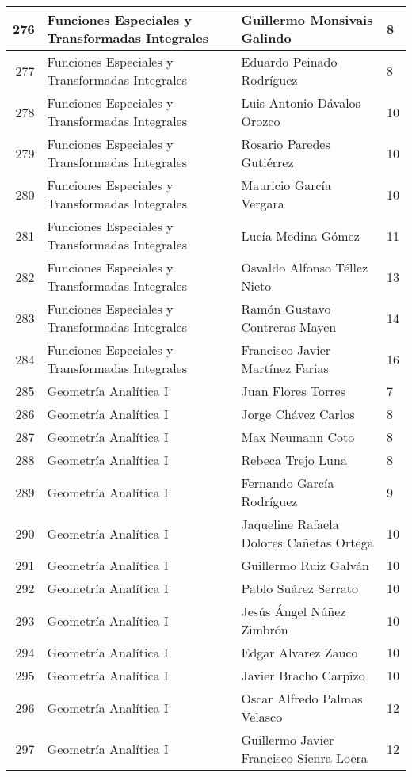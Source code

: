 \begin{table}[ht]
\begin{tabular}{rlll}
  276 & Funciones Especiales y Transformadas Integrales & Guillermo Monsivais Galindo & 8 \\ \hline
  277 & Funciones Especiales y Transformadas Integrales & Eduardo Peinado Rodríguez & 8 \\ \hline
  278 & Funciones Especiales y Transformadas Integrales & Luis Antonio Dávalos Orozco & 10 \\ \hline
  279 & Funciones Especiales y Transformadas Integrales & Rosario Paredes Gutiérrez & 10 \\ \hline
  280 & Funciones Especiales y Transformadas Integrales & Mauricio García Vergara & 10 \\ \hline
  281 & Funciones Especiales y Transformadas Integrales & Lucía Medina Gómez & 11 \\ \hline
  282 & Funciones Especiales y Transformadas Integrales & Osvaldo Alfonso Téllez Nieto & 13 \\ \hline
  283 & Funciones Especiales y Transformadas Integrales & Ramón Gustavo Contreras Mayen & 14 \\ \hline
  284 & Funciones Especiales y Transformadas Integrales & Francisco Javier Martínez Farias & 16 \\ \hline
  285 & Geometría Analítica I & Juan Flores Torres & 7 \\ \hline
  286 & Geometría Analítica I & Jorge Chávez Carlos & 8 \\ \hline
  287 & Geometría Analítica I & Max Neumann Coto & 8 \\ \hline
  288 & Geometría Analítica I & Rebeca Trejo Luna & 8 \\ \hline
  289 & Geometría Analítica I & Fernando García Rodríguez & 9 \\ \hline
  290 & Geometría Analítica I & Jaqueline Rafaela Dolores Cañetas Ortega & 10 \\ \hline
  291 & Geometría Analítica I & Guillermo Ruiz Galván & 10 \\ \hline
  292 & Geometría Analítica I & Pablo Suárez Serrato & 10 \\ \hline
  293 & Geometría Analítica I & Jesús Ángel Núñez Zimbrón & 10 \\ \hline
  294 & Geometría Analítica I & Edgar Alvarez Zauco & 10 \\ \hline
  295 & Geometría Analítica I & Javier Bracho Carpizo & 10 \\ \hline
  296 & Geometría Analítica I & Oscar Alfredo Palmas Velasco & 12 \\ \hline
  297 & Geometría Analítica I & Guillermo Javier Francisco Sienra Loera & 12 \\ \hline

\end{tabular}
\end{table}
